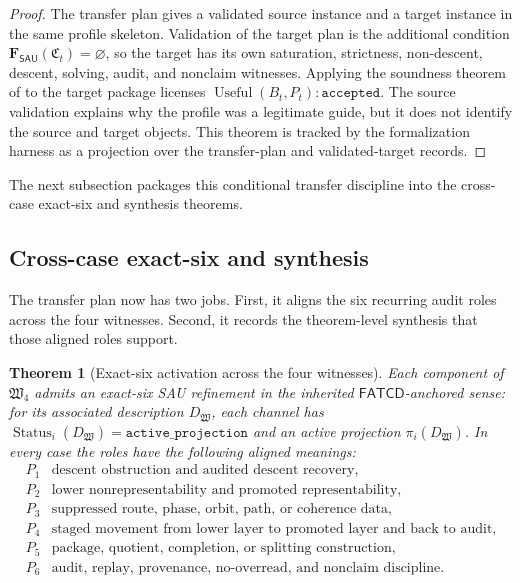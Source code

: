\documentclass[11pt]{article}
\newcommand{\SAU}{\mathsf{SAU}}
\newcommand{\Use}{\operatorname{Useful}}
\newtheorem{theorem}{Theorem}[section]
\theoremstyle{definition}
\begin{document}
\begin{proof}
The transfer plan gives a validated source instance and a target instance in the
same profile skeleton.  Validation of the target plan is the additional
condition \(\mathbf F_{\SAU}(\mathfrak C_t)=\varnothing\), so the target has its
own saturation, strictness, non-descent, descent, solving, audit, and nonclaim
witnesses.  Applying the soundness theorem of  to
the target package licenses \(\Use(B_t,P_t):\texttt{accepted}\).  The source
validation explains why the profile was a legitimate guide, but it does not
identify the source and target objects.  This theorem is tracked by the
formalization harness as a projection over the transfer-plan and validated-target
records.
\end{proof}

The next subsection packages this conditional transfer discipline into the
cross-case exact-six and synthesis theorems.

\subsection{Cross-case exact-six and synthesis}
\label{subsec:transfer-cross-case-synthesis}

The transfer plan now has two jobs.  First, it aligns the six recurring audit
roles across the four witnesses.  Second, it records the theorem-level synthesis
that those aligned roles support.

\begin{theorem}[Exact-six activation across the four witnesses]
\label{thm:sau-cross-exact-six}
Each component of \(\mathfrak W_4\) admits an exact-six SAU refinement in the inherited \(\mathsf{FATCD}\)-anchored sense: for its associated description \(D_{\mathfrak W}\), each channel has \(\operatorname{Status}_i(D_{\mathfrak W})=\texttt{active\_projection}\) and an active projection \(\pi_i(D_{\mathfrak W})\).  In every case the roles have the following aligned meanings:
\[
\begin{array}{c|l}
P_1 & \text{descent obstruction and audited descent recovery},\\
P_2 & \text{lower nonrepresentability and promoted representability},\\
P_3 & \text{suppressed route, phase, orbit, path, or coherence data},\\
P_4 & \text{staged movement from lower layer to promoted layer and back to audit},\\
P_5 & \text{package, quotient, completion, or splitting construction},\\
P_6 & \text{audit, replay, provenance, no-overread, and nonclaim discipline}.
\end{array}
\]
\end{theorem}
\end{document}
